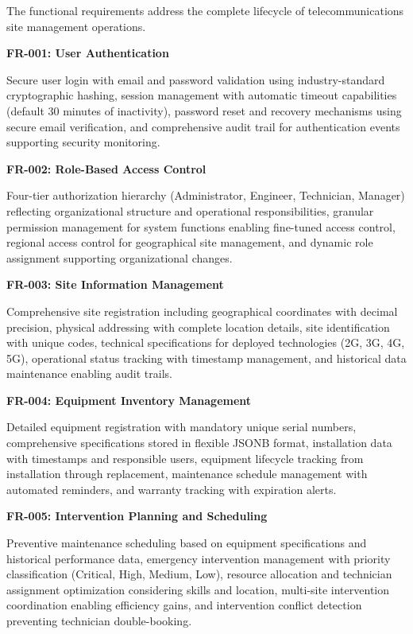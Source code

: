 The functional requirements address the complete lifecycle of telecommunications site management operations.

\textbf{FR-001: User Authentication}

Secure user login with email and password validation using industry-standard cryptographic hashing, session management with automatic timeout capabilities (default 30 minutes of inactivity), password reset and recovery mechanisms using secure email verification, and comprehensive audit trail for authentication events supporting security monitoring.

\textbf{FR-002: Role-Based Access Control}

Four-tier authorization hierarchy (Administrator, Engineer, Technician, Manager) reflecting organizational structure and operational responsibilities, granular permission management for system functions enabling fine-tuned access control, regional access control for geographical site management, and dynamic role assignment supporting organizational changes.

\textbf{FR-003: Site Information Management}

Comprehensive site registration including geographical coordinates with decimal precision, physical addressing with complete location details, site identification with unique codes, technical specifications for deployed technologies (2G, 3G, 4G, 5G), operational status tracking with timestamp management, and historical data maintenance enabling audit trails.

\textbf{FR-004: Equipment Inventory Management}

Detailed equipment registration with mandatory unique serial numbers, comprehensive specifications stored in flexible JSONB format, installation data with timestamps and responsible users, equipment lifecycle tracking from installation through replacement, maintenance schedule management with automated reminders, and warranty tracking with expiration alerts.

\textbf{FR-005: Intervention Planning and Scheduling}

Preventive maintenance scheduling based on equipment specifications and historical performance data, emergency intervention management with priority classification (Critical, High, Medium, Low), resource allocation and technician assignment optimization considering skills and location, multi-site intervention coordination enabling efficiency gains, and intervention conflict detection preventing technician double-booking.

